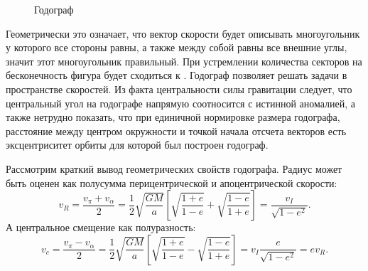 \begin{wrapfigure}[14]{l}{0.5\tw}
        \caption{Годограф}
    	\label{pic:hodograph2}    
\end{wrapfigure}
Геометрически это означает, что вектор скорости будет описывать многоугольник у которого все стороны равны, а также между собой равны все внешние углы, значит этот многоугольник правильный. При устремлении количества секторов на бесконечность фигура будет сходиться к . Годограф позволяет решать задачи в пространстве скоростей. Из факта центральности силы гравитации следует, что центральный угол на годографе напрямую соотносится с истинной аномалией, а также нетрудно показать, что при единичной нормировке размера годографа, расстояние между центром окружности и точкой начала отсчета векторов есть эксцентриситет орбиты для которой был построен годограф.

{\footnotesize
Рассмотрим краткий вывод геометрических свойств годографа. Радиус может быть оценен как полусумма перицентрической и апоцентрической скорости:
\begin{equation*}
	v_{R} = \frac{v_{\pi}+v_{\alpha}}{2}=\frac{1}{2}\sqrt{\frac{GM}{a}}\left[\sqrt{\frac{1+e}{1-e}}+\sqrt{\frac{1-e}{1+e}}\right]=\frac{v_I}{\sqrt{1-e^2}}.
\end{equation*}
А центральное смещение как полуразность:
\begin{equation*}
	v_{c} = \frac{v_{\pi}-v_{\alpha}}{2}=\frac{1}{2}\sqrt{\frac{GM}{a}}\left[\sqrt{\frac{1+e}{1-e}}-\sqrt{\frac{1-e}{1+e}}\right]=v_{I}\frac{e}{\sqrt{1-e^2}}=e v_{R}.
\end{equation*}
}

